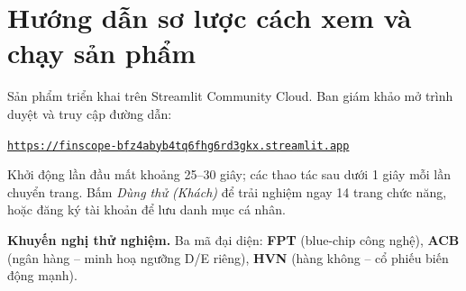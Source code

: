 \documentclass[12pt,a4paper]{article}
\begin{document}
\section{Hướng dẫn sơ lược cách xem và chạy sản phẩm}

\indent Sản phẩm triển khai trên Streamlit Community Cloud. Ban giám
khảo mở trình duyệt và truy cập đường dẫn:
\begin{center}
\href{https://finscope-bfz4abyb4tq6fhg6rd3gkx.streamlit.app}{\texttt{https://finscope-bfz4abyb4tq6fhg6rd3gkx.streamlit.app}}
\end{center}
Khởi động lần đầu mất khoảng 25--30 giây; các thao tác sau dưới 1 giây
mỗi lần chuyển trang. Bấm \emph{Dùng thử (Khách)} để trải nghiệm ngay
14 trang chức năng, hoặc đăng ký tài khoản để lưu danh mục cá nhân.

\vspace{4pt}
\noindent\textbf{Khuyến nghị thử nghiệm.} Ba mã đại diện: \textbf{FPT}
(blue-chip công nghệ), \textbf{ACB} (ngân hàng -- minh hoạ ngưỡng D/E
riêng), \textbf{HVN} (hàng không -- cổ phiếu biến động mạnh).
\end{document}
